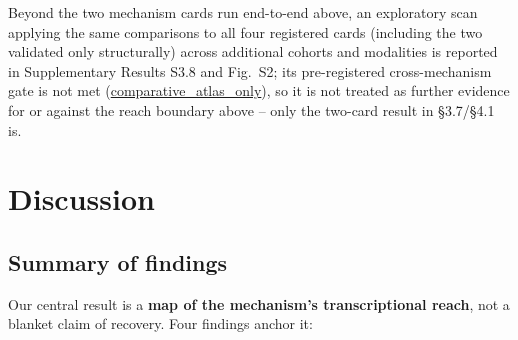 \documentclass[modern,large,numbered,nocrop]{oup-authoring-template}
\begin{document}
Beyond the two mechanism cards run end-to-end above, an exploratory scan applying the same comparisons to all four registered cards (including the two validated only structurally) across additional cohorts and modalities is reported in Supplementary Results S3.8 and Fig.~S2; its pre-registered cross-mechanism gate is not met (\url{comparative_atlas_only}), so it is not treated as further evidence for or against the reach boundary above -- only the two-card result in \S{}3.7/\S{}4.1 is.

\section{Discussion}

\subsection{Summary of findings}

Our central result is a \textbf{map of the mechanism's transcriptional reach}, not a blanket claim of recovery. Four findings anchor it:
\end{document}
